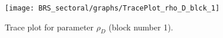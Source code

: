 \begin{figure}[H]
\centering
  \texttt{[image: BRS\_sectoral/graphs/TracePlot\_rho\_D\_blck\_1]}\\
    \caption{Trace plot for parameter ${\rho_D}$ (block number 1).}
\end{figure}
